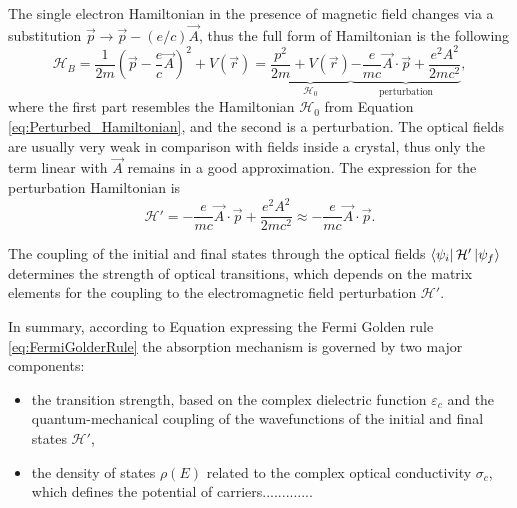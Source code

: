 \documentclass[titlepage,a4paper]{book}
\begin{document}
The single electron Hamiltonian in the presence of magnetic field changes via a substitution $\vec{p} \rightarrow \vec{p} - (e/c)\vec{A}$, thus the full form of Hamiltonian is the following
\begin{equation}
\label{eq:Perturbed_Hamiltonian2}
\mathcal{H}_{B} = \frac{1}{2m}\left( \vec{p} - \frac{e}{c}\vec{A}\right)^2 + V(\vec{r}) = \underbrace{\frac{p^2}{2m} + V(\vec{r})}_{\mathcal{H}_0} \underbrace{-\frac{e}{mc}\vec{A}\cdot\vec{p}+\frac{e^2 A^2}{2mc^2}}_{\text{perturbation}},
\end{equation}
where the first part resembles the Hamiltonian $\mathcal{H}_0$ from Equation \ref{eq:Perturbed_Hamiltonian}, and the second is a perturbation. The optical fields are usually very weak in comparison with fields inside a crystal, thus only the term linear with $\vec{A}$ remains in a good approximation. The expression for the perturbation Hamiltonian is
\begin{equation}
\label{eq:Perturbed_Hamiltonian3}
\mathcal{H}' = -\frac{e}{mc}\vec{A}\cdot\vec{p}+\frac{e^2 A^2}{2mc^2} \approx -\frac{e}{mc}\vec{A}\cdot\vec{p}.
\end{equation}

The coupling of the initial and final states through the optical fields $\bra{\psi_i}\mathcal{H}'\ket{\psi_f}$ determines the strength of optical transitions, which depends on the matrix elements for the coupling to the electromagnetic field perturbation $\mathcal{H}'$.

In summary, according to Equation expressing the Fermi Golden rule \ref{eq:FermiGolderRule} the absorption mechanism is governed by two major components:
\begin{itemize}
\item the transition strength, based on the complex dielectric function $\varepsilon_c$ and the quantum-mechanical coupling of the wavefunctions of the initial and final states $\mathcal{H}'$,
\item the density of states $\rho (E)$ related to the complex optical conductivity $\sigma_c$, which defines the potential of carriers............. 
\end{itemize}
\end{document}
